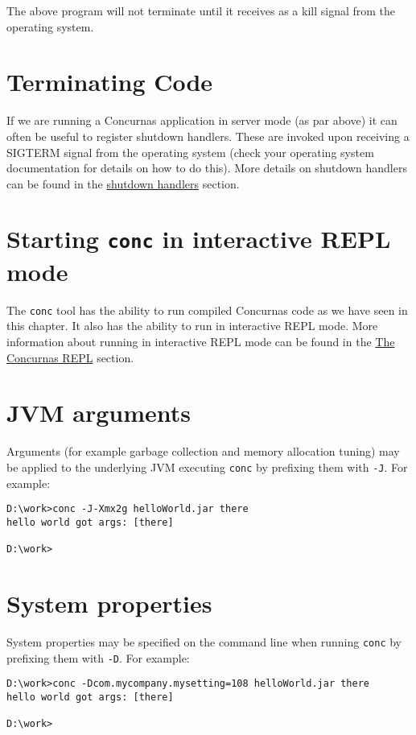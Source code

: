 \documentclass[conc-doc]{subfiles}
\begin{document}
The above program will not terminate until it receives as a kill signal from the operating system.

\section{Terminating Code}
If we are running a Concurnas application in server mode (as par above) it can often be useful to register shutdown handlers. These are invoked upon receiving a SIGTERM signal from the operating system (check your operating system documentation for details on how to do this). More details on shutdown handlers can be found in the \hyperref[sec:shutdownHandle]{shutdown handlers} section. 

\section{Starting \lstinline[language=None]!conc! in interactive REPL mode}
The \lstinline[language=None]{conc} tool has the ability to run compiled Concurnas code as we have seen in this chapter. It also has the ability to run in interactive REPL mode. More information about running in interactive REPL mode can be found in the \hyperref[ch:repl]{The Concurnas REPL} section.

\section{JVM arguments}
Arguments (for example garbage collection and memory allocation tuning) may be applied to the underlying JVM executing \lstinline[language=None]{conc} by prefixing them with \lstinline[language=None]{-J}. For example:

\begin{lstlisting}[language=None]
D:\work>conc -J-Xmx2g helloWorld.jar there
hello world got args: [there]

D:\work>
\end{lstlisting}

\section{System properties}
System properties may be specified on the command line when running \lstinline[language=None]{conc} by prefixing them with \lstinline[language=None]{-D}. For example:

\begin{lstlisting}[language=None]
D:\work>conc -Dcom.mycompany.mysetting=108 helloWorld.jar there
hello world got args: [there]

D:\work>
\end{lstlisting}
\end{document}
